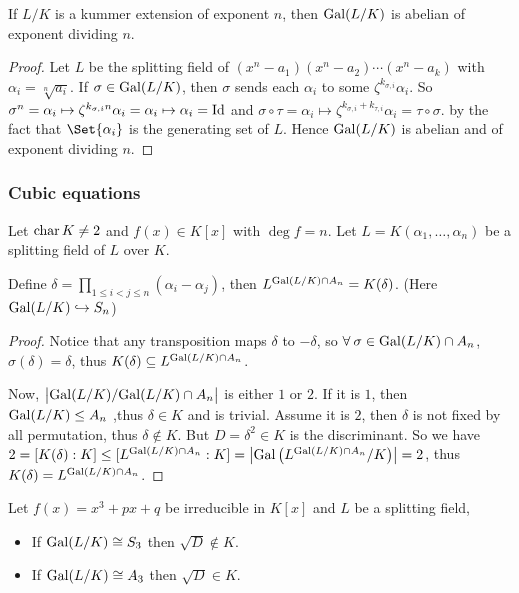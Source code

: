 \begin{theorem}
  If $L/K$ is a kummer extension of exponent $n$, then $\Gal(L/K)$ is abelian of exponent dividing $n$.

  \begin{proof}
    Let $L$ be the splitting field of $(x^n - a_1)(x^n - a_2) \dotsm (x^n - a_k)$ with $\alpha_i = \sqrt[n]{a_i}$.
    If $\sigma \in \Gal(L/K)$, then $\sigma$ sends each $\alpha_i$ to some $\zeta^{k_{\sigma, i}} \alpha_i$.
    So $\sigma^n = \alpha_i \mapsto \zeta^{k_{\sigma, i} n} \alpha_i = \alpha_i \mapsto \alpha_i = \Id$
    and $\sigma \circ \tau = \alpha_i \mapsto \zeta^{k_{\sigma, i} + k_{\tau, i}} \alpha_i = \tau \circ \sigma$.
    by the fact that  $\Set{\alpha_i}$ is the generating set of $L$. Hence $\Gal(L/K)$ is abelian and of
    exponent dividing $n$.
  \end{proof}
\end{theorem}

\subsubsection{Cubic equations}

\begin{lemma}
  Let $\Char K \neq 2$ and $f(x) \in K[x]$ with $\deg f = n$. Let
  $L = K(\alpha_1, \dots, \alpha_n)$ be a splitting field of $L$ over $K$.

  Define $\delta = \prod\limits_{1 \leq i < j \leq n} (\alpha_i - \alpha_j)$, then
  $L^{\Gal(L/K) \cap A_n} = K(\delta)$.  (Here $\Gal(L/K) \toone S_n$)

  \begin{proof}
    Notice that any transposition maps $\delta$ to $-\delta$, so
    $\forall \sigma \in \Gal(L/K) \cap A_n$, $\sigma(\delta) = \delta$, thus
    $K(\delta) \subseteq L^{\Gal(L/K) \cap A_n}$.

    Now, $\big| \quot{\Gal(L/K)}{\Gal(L/K) \cap A_n} \big|$ is either $1$ or $2$.
    If it is $1$, then $\Gal(L/K) \leq A_n$ ,thus $\delta \in K$ and is trivial.
    Assume it is $2$, then $\delta$ is not fixed by all permutation, thus
    $\delta \not\in K$. But $D = \delta^2 \in K$ is the discriminant. So we have
    $2 = [K(\delta): K] \le [L^{\Gal(L/K) \cap A_n}: K] =
    \abs*{\Gal \big( L^{\Gal(L/K) \cap A_n}/K \big)} = 2$, thus
    $K(\delta) = L^{\Gal(L/K) \cap A_n}$.
  \end{proof}
\end{lemma}

\begin{prop}
  Let $f(x) = x^3 + px + q$ be irreducible in $K[x]$ and $L$ be a splitting field,
  \begin{itemize}
    \item If $\Gal(L/K) \cong S_3$ then $\sqrt{D} \not\in K$.
    \item If $\Gal(L/K) \cong A_3$ then $\sqrt{D} \in K$.
  \end{itemize}
\end{prop}

